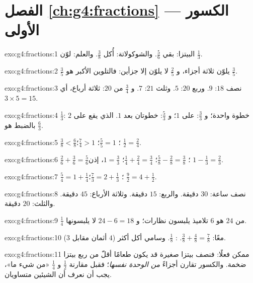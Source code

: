 \section*{الفصل \ref{ch:g4:fractions} --- الكسور الأولى}

\begin{solution}{exo:g4:fractions:1}
البيتزا: بقي $\frac56$. والشوكولاتة: أُكل $\frac38$. والعلم:
لوّن $\frac13$.
\end{solution}

\begin{solution}{exo:g4:fractions:2}
$\frac35$ يلوّن ثلاثة أجزاء، و $\frac25$ لا يلوّن إلا جزأين:
فالتلوين الأكبر هو $\frac35$.
\end{solution}

\begin{solution}{exo:g4:fractions:3}
نصف $18$: $9$. وربع $20$: $5$. وثلث $21$: $7$.
و $\frac34$ من $20$: ثلاثة أرباع، أي $3 \times 5 = 15$.
\end{solution}

\begin{solution}{exo:g4:fractions:4}
$\frac13$: خطوة واحدة؛ و $\frac33$: على $1$؛ و $\frac53$: خطوتان بعد
$1$.  الذي يقع على $2$ بالضبط هو $\frac63$.
\end{solution}

\begin{solution}{exo:g4:fractions:5}
$\frac38 < \frac68$؛ \quad $\frac55 = 1$؛ \quad $\frac74 > 1$؛
\quad $\frac12 = \frac24$.
\end{solution}

\begin{solution}{exo:g4:fractions:6}
$\frac26 + \frac36 = \frac56$؛ \quad
$\frac58 - \frac28 = \frac38$؛ \quad
$\frac14 + \frac24 = \frac34$؛ \quad
$1 = \frac33$، إذن $1 - \frac13 = \frac23$.
\end{solution}

\begin{solution}{exo:g4:fractions:7}
$\frac54 = 1 + \frac14$؛ \quad
$\frac73 = 2 + \frac13$؛ \quad
$\frac92 = 4 + \frac12$.
\end{solution}

\begin{solution}{exo:g4:fractions:8}
نصف ساعة: $30$ دقيقة. والربع: $15$ دقيقة. وثلاثة الأرباع: $45$
دقيقة. والثلث: $20$ دقيقة.
\end{solution}

\begin{solution}{exo:g4:fractions:9}
$\frac14$ من $24$ هو $6$ تلاميذ يلبسون نظارات؛ و $24 - 6 = 18$
لا يلبسونها.
\end{solution}

\begin{solution}{exo:g4:fractions:10}
معًا: $\frac38 + \frac48 = \frac78$. : $\frac18$. وسامي أكل
أكثر ($4$ أثمان مقابل $3$).
\end{solution}

\begin{solution}{exo:g4:fractions:11}
ممكن فعلًا: فنصف بيتزا صغيرة قد يكون طعامًا أقلّ من
ربع بيتزا ضخمة. والكسور تقارن أجزاءً \emph{من الوحدة
نفسها}؛ فقبل مقارنة $\frac12$ و $\frac14$ «من شيء ما»،
يجب أن نعرف أن الشيئين متساويان.
\end{solution}
